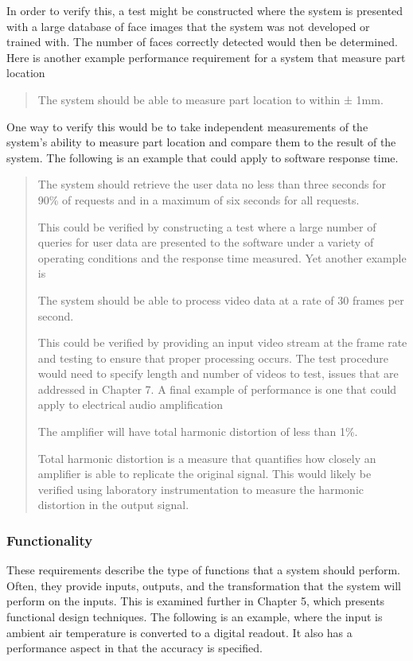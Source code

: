In order to verify this, a test might be constructed where the system is
presented with a large database of face images that the system was not
developed or trained with. The number of faces correctly detected would
then be determined. Here is another example performance requirement for
a system that measure part location

\begin{quote}
The system should be able to measure part location to within ± 1mm.
\end{quote}

One way to verify this would be to take independent measurements of the
system's ability to measure part location and compare them to the result
of the system. The following is an example that could apply to software
response time.

\begin{quote}
The system should retrieve the user data no less than three seconds for
90\% of requests and in a maximum of six seconds for all requests.

This could be verified by constructing a test where a large number of
queries for user data are presented to the software under a variety of
operating conditions and the response time measured. Yet another example
is

The system should be able to process video data at a rate of 30 frames
per second.

This could be verified by providing an input video stream at the frame
rate and testing to ensure that proper processing occurs. The test
procedure would need to specify length and number of videos to test,
issues that are addressed in Chapter 7. A final example of performance
is one that could apply to electrical audio amplification

The amplifier will have total harmonic distortion of less than 1\%.

Total harmonic distortion is a measure that quantifies how closely an
amplifier is able to replicate the original signal. This would likely be
verified using laboratory instrumentation to measure the harmonic
distortion in the output signal.
\end{quote}

\subsubsection*{Functionality}\label{functionality}

These requirements describe the type of functions that a system should
perform. Often, they provide inputs, outputs, and the transformation
that the system will perform on the inputs. This is examined further in
Chapter 5, which presents functional design techniques. The following is
an example, where the input is ambient air temperature is converted to a
digital readout. It also has a performance aspect in that the accuracy
is specified.

